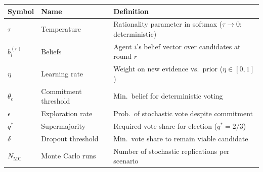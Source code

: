 
\begin{tcolorbox}[colback=yellow!5!white, colframe=yellow!75!black, title=Quick Reference]
\small
\renewcommand{\arraystretch}{1.2}
\begin{tabular}{@{}lll@{}}
\toprule
\textbf{Symbol} & \textbf{Name} & \textbf{Definition} \\
\midrule
$\tau$ & Temperature & Rationality parameter in softmax ($\tau \to 0$: deterministic) \\
$b_i^{(r)}$ & Beliefs & Agent $i$'s belief vector over candidates at round $r$ \\
$\eta$ & Learning rate & Weight on new evidence vs.\ prior ($\eta \in [0,1]$) \\
$\theta_c$ & Commitment threshold & Min.\ belief for deterministic voting \\
$\epsilon$ & Exploration rate & Prob.\ of stochastic vote despite commitment \\
$q^*$ & Supermajority & Required vote share for election ($q^* = 2/3$) \\
$\delta$ & Dropout threshold & Min.\ vote share to remain viable candidate \\
$N_{\text{MC}}$ & Monte Carlo runs & Number of stochastic replications per scenario \\
\bottomrule
\end{tabular}
\end{tcolorbox}



